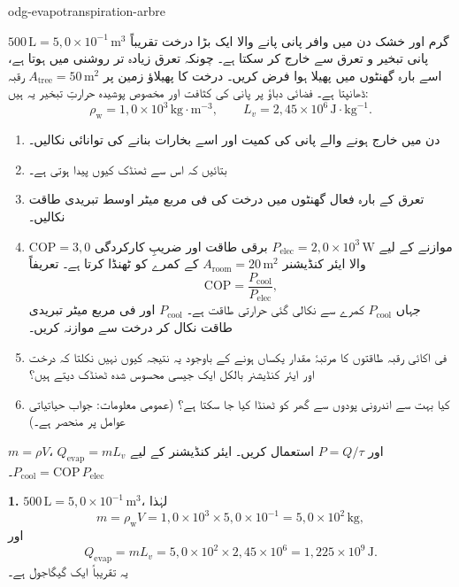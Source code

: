 \begin{exo}{odg-evapotranspiration-arbre}

گرم اور خشک دن میں وافر پانی پانے والا ایک بڑا درخت تقریباً $500\,\text{L}=5{,}0\times10^{-1}\,\text{m}^3$ پانی تبخیر و تعرق سے خارج کر سکتا ہے۔ چونکہ تعرق زیادہ تر روشنی میں ہوتا ہے، اسے بارہ گھنٹوں میں پھیلا ہوا فرض کریں۔ درخت کا پھیلاؤ زمین پر $A_{\mathrm{tree}}=50\,\text{m}^2$ رقبہ ڈھانپتا ہے۔ فضائی دباؤ پر پانی کی کثافت اور مخصوص پوشیدہ حرارتِ تبخیر یہ ہیں:
\[
\rho_{\mathrm{w}}=1{,}0\times10^3\,\text{kg}\!\cdot\!\text{m}^{-3},
\qquad L_v=2{,}45\times10^6\,\text{J}\!\cdot\!\text{kg}^{-1}.
\]

\begin{enumerate}
  \item دن میں خارج ہونے والے پانی کی کمیت اور اسے بخارات بنانے کی توانائی نکالیں۔
  \item بتائیں کہ اس سے ٹھنڈک کیوں پیدا ہوتی ہے۔
  \item تعرق کے بارہ فعال گھنٹوں میں درخت کی فی مربع میٹر اوسط تبریدی طاقت نکالیں۔
  \item موازنے کے لیے $P_{\mathrm{elec}}=2{,}0\times10^3\,\text{W}$ برقی طاقت اور ضریبِ کارکردگی $\mathrm{COP}=3{,}0$ والا ایئر کنڈیشنر $A_{\mathrm{room}}=20\,\text{m}^2$ کے کمرے کو ٹھنڈا کرتا ہے۔ تعریفاً
\[
\mathrm{COP}=\frac{P_{\mathrm{cool}}}{P_{\mathrm{elec}}},
\]
جہاں $P_{\mathrm{cool}}$ کمرے سے نکالی گئی حرارتی طاقت ہے۔ $P_{\mathrm{cool}}$ اور فی مربع میٹر تبریدی طاقت نکال کر درخت سے موازنہ کریں۔
  \item فی اکائی رقبہ طاقتوں کا مرتبۂ مقدار یکساں ہونے کے باوجود یہ نتیجہ کیوں نہیں نکلتا کہ درخت اور ایئر کنڈیشنر بالکل ایک جیسی محسوس شدہ ٹھنڈک دیتے ہیں؟
  \item کیا بہت سے اندرونی پودوں سے گھر کو ٹھنڈا کیا جا سکتا ہے؟ (عمومی معلومات: جواب حیاتیاتی عوامل پر منحصر ہے۔)
\end{enumerate}

\begin{indication}
$m=\rho V$، $Q_{\mathrm{evap}}=mL_v$ اور $P=Q/\tau$ استعمال کریں۔ ایئر کنڈیشنر کے لیے $P_{\mathrm{cool}}=\mathrm{COP}\,P_{\mathrm{elec}}$۔
\end{indication}

\begin{solution}
\textbf{1.} $500\,\text{L}=5{,}0\times10^{-1}\,\text{m}^3$، لہٰذا
\[
m=\rho_{\mathrm{w}}V=1{,}0\times10^3\times5{,}0\times10^{-1}=5{,}0\times10^2\,\text{kg},
\]
اور
\[
Q_{\mathrm{evap}}=mL_v=5{,}0\times10^2\times2{,}45\times10^6=1{,}225\times10^9\,\text{J}.
\]
یہ تقریباً ایک گیگاجول ہے۔


\end{solution}
\end{exo}

